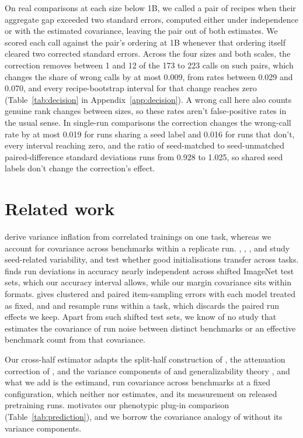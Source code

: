 On real comparisons at each size below 1B, we called a pair of recipes when their aggregate gap exceeded two standard errors, computed either under independence or with the estimated covariance, leaving the pair out of both estimates. We scored each call against the pair's ordering at 1B whenever that ordering itself cleared two corrected standard errors. Across the four sizes and both scales, the correction removes between 1 and 12 of the 173 to 223 calls on such pairs, which changes the share of wrong calls by at most 0.009, from rates between 0.029 and 0.070, and every recipe-bootstrap interval for that change reaches zero (Table~\ref{tab:decision} in Appendix~\ref{app:decision}). A wrong call here also counts genuine rank changes between sizes, so these rates aren't false-positive rates in the usual sense. In single-run comparisons the correction changes the wrong-call rate by at most 0.019 for runs sharing a seed label and 0.016 for runs that don't, every interval reaching zero, and the ratio of seed-matched to seed-unmatched paired-difference standard deviations runs from 0.928 to 1.025, so shared seed labels don't change the correction's effect.


\section{Related work}
\citet{bouthillier2021} derive variance inflation from correlated trainings on one task, whereas we account for covariance across benchmarks within a replicate run. \citet{reimers2017}, \citet{zhou2020}, \citet{madaan2024}, and \citet{fehlauer2025} study seed-related variability, and \citet{dodge2020} test whether good initialisations transfer across tasks. \citet{jordan2024} finds run deviations in accuracy nearly independent across shifted ImageNet test sets, which our accuracy interval allows, while our margin covariance sits within formats. \citet{miller2024} gives clustered and paired item-sampling errors with each model treated as fixed, and \citet{henderson2018} and \citet{agarwal2021} resample runs within a task, which discards the paired run effects we keep. Apart from such shifted test sets, we know of no study that estimates the covariance of run noise between distinct benchmarks or an effective benchmark count from that covariance.

Our cross-half estimator adapts the split-half construction of \citet{spearman1910,brown1910}, the attenuation correction of \citet{spearman1904}, and the variance components of \citet{searle1992} and generalizability theory \citep{brennan2001}, and what we add is the estimand, run covariance across benchmarks at a fixed configuration, which neither \citet{miller2024} nor \citet{heineman2025} estimates, and its measurement on released pretraining runs. \citet{cheverud1988} motivates our phenotypic plug-in comparison (Table~\ref{tab:prediction}), and we borrow the covariance analogy of \citet{martin1977} without its variance components.

